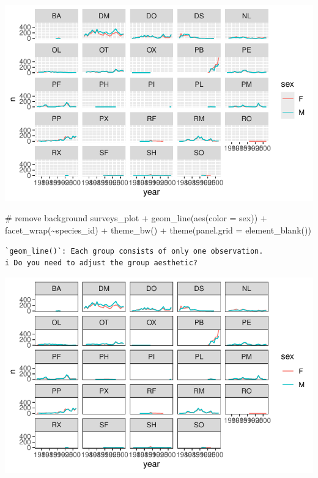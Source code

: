 \documentclass[
  letterpaper,
  DIV=11,
  numbers=noendperiod]{scrreprt}
\newenvironment{Shaded}{\begin{snugshade}}{\end{snugshade}}
\newcommand{\AttributeTok}[1]{\textcolor[rgb]{0.40,0.45,0.13}{#1}}
\newcommand{\CommentTok}[1]{\textcolor[rgb]{0.37,0.37,0.37}{#1}}
\newcommand{\FunctionTok}[1]{\textcolor[rgb]{0.28,0.35,0.67}{#1}}
\newcommand{\NormalTok}[1]{\textcolor[rgb]{0.00,0.23,0.31}{#1}}
\newcommand{\SpecialCharTok}[1]{\textcolor[rgb]{0.37,0.37,0.37}{#1}}
\begin{document}
\includegraphics{src/notebooks/r_files/figure-pdf/unnamed-chunk-48-5.pdf}

\begin{Shaded}
\begin{Highlighting}[]
\CommentTok{\# remove background}
\NormalTok{surveys\_plot }\SpecialCharTok{+} \FunctionTok{geom\_line}\NormalTok{(}\FunctionTok{aes}\NormalTok{(}\AttributeTok{color =}\NormalTok{ sex)) }\SpecialCharTok{+}
  \FunctionTok{facet\_wrap}\NormalTok{(}\SpecialCharTok{\textasciitilde{}}\NormalTok{species\_id) }\SpecialCharTok{+}
  \FunctionTok{theme\_bw}\NormalTok{() }\SpecialCharTok{+}
  \FunctionTok{theme}\NormalTok{(}\AttributeTok{panel.grid =} \FunctionTok{element\_blank}\NormalTok{())}
\end{Highlighting}
\end{Shaded}

\begin{verbatim}
`geom_line()`: Each group consists of only one observation.
i Do you need to adjust the group aesthetic?
\end{verbatim}

\includegraphics{src/notebooks/r_files/figure-pdf/unnamed-chunk-48-6.pdf}
\end{document}
